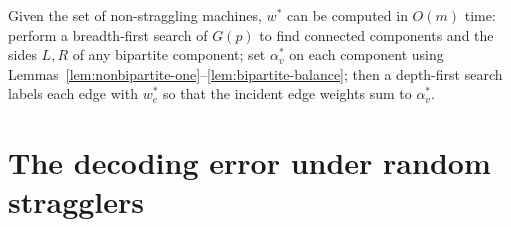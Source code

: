 \begin{lemma}
  \label{lem:linear-time-decode}
  \notready
  Given the set of non-straggling machines, $w^*$ can be computed in $O(m)$ time:
  perform a breadth-first search of $G(p)$ to find connected components and the
  sides $L,R$ of any bipartite component; set $\alpha^*_v$ on each component using
  Lemmas~\ref{lem:nonbipartite-one}--\ref{lem:bipartite-balance}; then a
  depth-first search labels each edge with $w^*_e$ so that the incident edge
  weights sum to $\alpha^*_v$.
\end{lemma}

\chapter{The decoding error under random stragglers}

